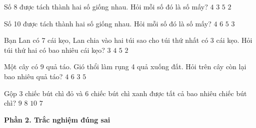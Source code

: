 \begin{ex} %
Số 8 được tách thành hai số giống nhau. Hỏi mỗi số đó là số mấy?
\choice
{\True $4$}
{$3$}
{$5$}
{$2$}
\end{ex}

\begin{ex} %
Số 10 được tách thành hai số giống nhau. Hỏi mỗi số đó là số mấy?
\choice
{$4$}
{$6$}
{\True $5$}
{$3$}
\end{ex}

\begin{ex} %
Bạn Lan có 7 cái kẹo, Lan chia vào hai túi sao cho túi thứ nhất có 3 cái kẹo. Hỏi túi thứ hai có bao nhiêu cái kẹo?
\choice
{$3$}
{\True $4$}
{$5$}
{$2$}
\end{ex}

\begin{ex} %
Một cây có 9 quả táo. Gió thổi làm rụng 4 quả xuống đất. Hỏi trên cây còn lại bao nhiêu quả táo?
\choice
{$4$}
{$6$}
{$3$}
{\True $5$}
\end{ex}

\begin{ex} %
Gộp 3 chiếc bút chì đỏ và 6 chiếc bút chì xanh được tất cả bao nhiêu chiếc bút chì?
\choice
{\True $9$}
{$8$}
{$10$}
{$7$}
\end{ex}

\textbf{Phần 2. Trắc nghiệm đúng sai}

